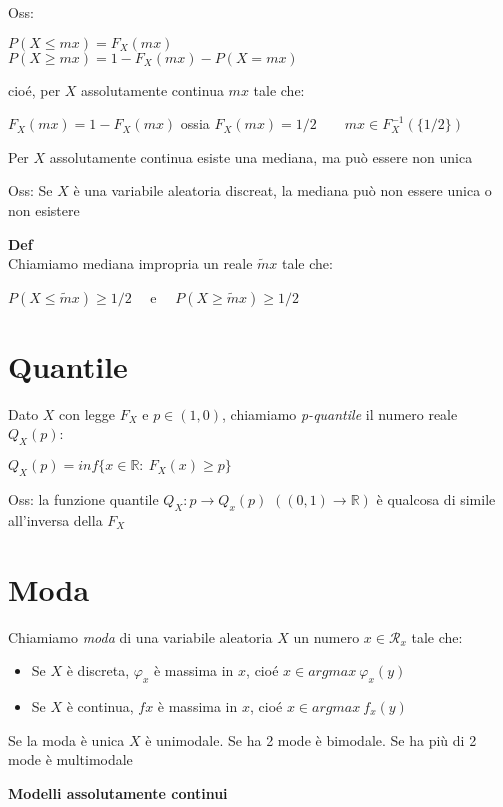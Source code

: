 \documentclass[11pt, letterpaper]{article}
\begin{document}
\newpage
Oss:
\begin{center}
    $P(X\leq mx)=F_{X}(mx)$\\
    $P(X\geq mx)=1-F_{X}(mx)-P(X=mx)$
\end{center}
cioé, per $X$ assolutamente continua $mx$ tale che:
\begin{center}
    $F_{X}(mx)=1-F_{X}(mx)$ ossia $F_{X}(mx)=1/2\qquad mx\in F_{X}^{-1}(\{1/2\})$
\end{center}
Per $X$ assolutamente continua esiste una mediana, ma può essere non unica

Oss: Se $X$ è  una variabile aleatoria discreat, la mediana può non essere unica o non esistere

\textbf{Def}\\ Chiamiamo mediana impropria un reale $\widetilde{m}x$ tale che:
\begin{center}
    $P(X\leq\widetilde{m}x)\geq 1/2\quad$ e $\quad P(X\geq\widetilde{m}x)\geq 1/2$    
\end{center}

\section{Quantile}
Dato $X$ con legge $F_{X}$ e $p\in(1,0)$, chiamiamo \textit{p-quantile} il numero reale $Q_{X}(p)$:
\begin{center}
    $Q_{X}(p)=inf\{x\in\mathbb{R}:\ F_{X}(x)\geq p\}$
\end{center}

Oss: la funzione quantile $Q_{X}:p\rightarrow Q_{x}(p)$ $((0,1)\rightarrow\mathbb{R})$ è qualcosa di simile
all'inversa della $F_{X}$

\section{Moda}
Chiamiamo \textit{moda} di una variabile aleatoria $X$ un numero $x\in\mathcal{R}_{x}$ tale che:
\begin{itemize}
    \item Se $X$ è discreta, $\varphi_{x}$ è massima in $x$, cioé $x\in argmax\ \varphi_{x}(y)$
    \item Se $X$ è continua, $f{x}$ è massima in $x$, cioé $x\in argmax\ f_{x}(y)$
\end{itemize}

Se la moda è unica $X$ è unimodale. Se ha 2 mode è bimodale. Se ha più di 2 mode è multimodale

\newpage
\textbf{Modelli assolutamente continui}
\end{document}
